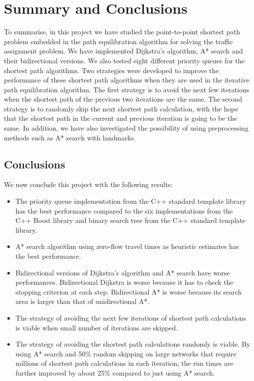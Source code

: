 \chapter{Summary and Conclusions} \label{chap:conclusions}
To summarise,
in this project we have studied the point-to-point shortest path problem embedded in the path equilibration algorithm for solving the traffic assignment problem.
We have implemented Dijkstra's algorithm, A* search and their bidirectional versions.
We also tested eight different priority queues for the shortest path algorithms.
Two strategies were developed to improve the performance of these shortest path algorithms when they are used in the iterative path equilibration algorithm.
The first strategy is to avoid the next few iterations
when the shortest path of the previous two iterations are the same.
The second strategy is to randomly skip the next shortest path calculation,
with the hope that the shortest path in the current and previous iteration is going to be the same.
In addition,
we have also investigated the possibility of using preprocessing methods such as A* search with landmarks.

\section{Conclusions}
We now conclude this project with the following results:
\begin{itemize}
    \item The priority queue implementation from the C++ standard template library has the best performance compared to the six implementations from the C++ Boost library and binary search tree from the C++ standard template library.
    \item A* search algorithm using zero-flow travel times as heuristic estimates has the best performance.
    \item Bidirectional versions of Dijkstra's algorithm and A* search have worse performances. Bidirectional Dijkstra is worse because it has to check the stopping criterion at each step. Bidirectional A* is worse because its search area is larger than that of unidirectional A*.
    \item The strategy of avoiding the next few iterations of shortest path calculations is viable when small number of iterations are skipped.
    \item The strategy of avoiding the shortest path calculations randomly is viable. By using A* search and 50\% random skipping on large networks that require millions of shortest path calculations in each iteration, the run times are further improved by about 25\% compared to just using A* search.
\end{itemize}

